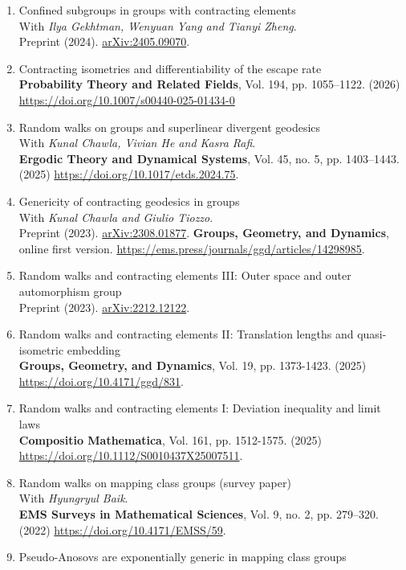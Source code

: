 \documentclass[a4paper, 10pt]{article}
\begin{document}
\begin{enumerate}
\item Confined subgroups in groups with contracting elements \\
With {\it Ilya Gekhtman, Wenyuan Yang and Tianyi Zheng}. \\
Preprint (2024).  \href{https://arxiv.org/abs/2405.09070}{arXiv:2405.09070}.
\item Contracting isometries and differentiability of the escape rate\\
{\bf Probability Theory and Related Fields}, Vol. 194, pp. 1055–1122. (2026) \url{https://doi.org/10.1007/s00440-025-01434-0}
\item Random walks on groups and superlinear divergent geodesics \\
With {\it Kunal Chawla, Vivian He and Kasra Rafi}. \\
{\bf Ergodic Theory and Dynamical Systems}, Vol. 45, no. 5, pp. 1403--1443. (2025) \url{https://doi.org/10.1017/etds.2024.75}.
\item Genericity of contracting geodesics in groups \\
With {\it Kunal Chawla and Giulio Tiozzo}. \\
Preprint (2023).  \href{https://arxiv.org/abs/2308.01877}{arXiv:2308.01877}. {\bf Groups, Geometry, and Dynamics}, online first version. \url{https://ems.press/journals/ggd/articles/14298985}.
\item Random walks and contracting elements III: Outer space and outer automorphism group \\
Preprint (2023). \href{https://arxiv.org/abs/2212.12122}{arXiv:2212.12122}. 
\item Random walks and contracting elements II: Translation lengths and quasi-isometric embedding \\
{\bf Groups, Geometry, and Dynamics}, Vol. 19, pp. 1373-1423. (2025) \url{https://doi.org/10.4171/ggd/831}.
\item Random walks and contracting elements I: Deviation inequality and limit laws\\
{\bf Compositio Mathematica}, Vol. 161, pp. 1512-1575. (2025) \url{https://doi.org/10.1112/S0010437X25007511}.
\item Random walks on mapping class groups (survey paper) \\
With {\it Hyungryul Baik}.\\
{\bf EMS Surveys in Mathematical Sciences}, Vol. 9, no. 2, pp. 279–320. (2022) \url{https://doi.org/10.4171/EMSS/59}.
\item Pseudo-Anosovs are exponentially generic in mapping class groups\\

\end{enumerate}
\end{document}
